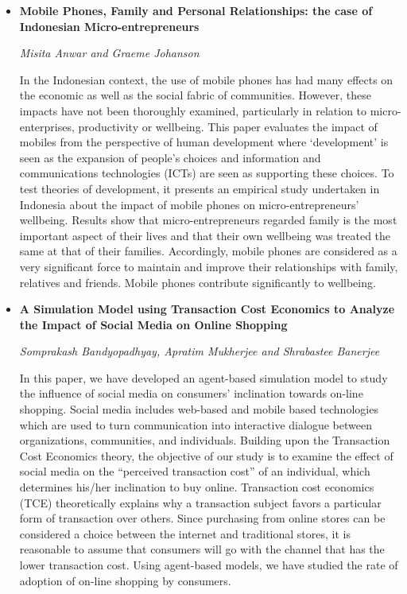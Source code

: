 \begin{itemize}
\item \textbf{Mobile Phones, Family and Personal Relationships: the case of
Indonesian Micro-entrepreneurs}

\textit{Misita Anwar and Graeme Johanson}

In the Indonesian context, the use of mobile phones has had many effects on the
economic as well as the social fabric of communities. However, these impacts
have not been thoroughly examined, particularly in relation to
micro-enterprises, productivity or wellbeing. This paper evaluates the impact of
mobiles from the perspective of human development where ‘development’ is seen as
the expansion of people’s choices and information and communications
technologies (ICTs) are seen as supporting these choices. To test theories of
development, it presents an empirical study undertaken in Indonesia about the
impact of mobile phones on micro-entrepreneurs’ wellbeing. Results show that
micro-entrepreneurs regarded family is the most important aspect of their lives
and that their own wellbeing was treated the same at that of their families.
Accordingly, mobile phones are considered as a very significant force to
maintain and improve their relationships with family, relatives and friends.
Mobile phones contribute significantly to wellbeing.

\item \textbf{A Simulation Model using Transaction Cost Economics to Analyze the
Impact of Social Media on Online Shopping}

\textit{Somprakash Bandyopadhyay, Apratim Mukherjee and Shrabastee Banerjee}

In this paper, we have developed an agent-based simulation model to study the
influence of social media on consumers’ inclination towards on-line shopping.
Social media includes web-based and mobile based technologies which are used to
turn communication into interactive dialogue between organizations, communities,
and individuals. Building upon the Transaction Cost Economics theory, the
objective of our study is to examine the effect of social media on the
“perceived transaction cost” of an individual, which determines his/her
inclination to buy online. Transaction cost economics (TCE) theoretically
explains why a transaction subject favors a particular form of transaction over
others. Since purchasing from online stores can be considered a choice between
the internet and traditional stores, it is reasonable to assume that consumers
will go with the channel that has the lower transaction cost. Using agent-based
models, we have studied the rate of adoption of on-line shopping by consumers.


\end{itemize}
